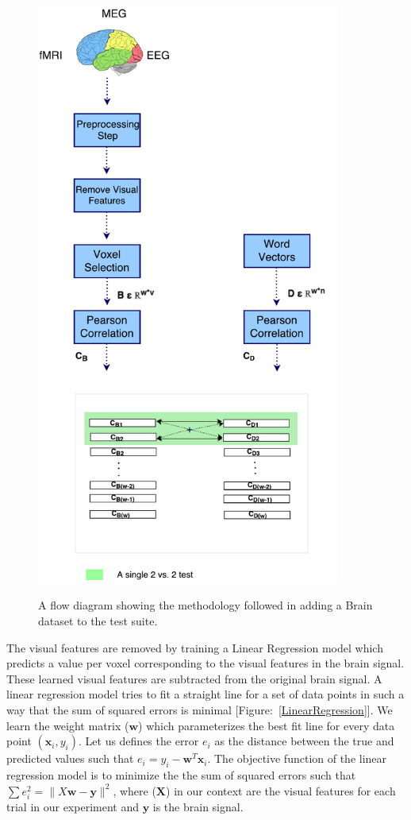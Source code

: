 \begin{figure}[!hb]
\centering
\includegraphics[width=10cm, height=20cm]{Figures/BrainBenchDiagram1}
\caption{A flow diagram showing the methodology followed in adding a Brain dataset to the test suite.}
\label{BrainBenchMethod}
\end{figure}


The visual features are removed by training a Linear Regression model which predicts a value per voxel corresponding to the visual features in the brain signal. These learned visual features are subtracted from the original brain signal. A linear regression model tries to fit a straight line for a set of data points in such a way that the sum of squared errors is minimal [Figure:~\ref{LinearRegression}].  We learn the weight matrix ($\mathbf w$) which parameterizes the best fit line for every data point $(\mathbf x_i, y_i)$. Let us defines the error $e_i$ as the distance between the true and predicted values such that $e_i = y_i - \mathbf w^T \mathbf x_i$. The objective function of the linear regression model is to minimize the the sum of squared errors such that $\sum e_i^2 =  \| X \mathbf w - \mathbf y \|^2$, where ($\mathbf X$)  in our context are the visual features for each trial in our experiment and $\mathbf y$ is the brain signal. 



